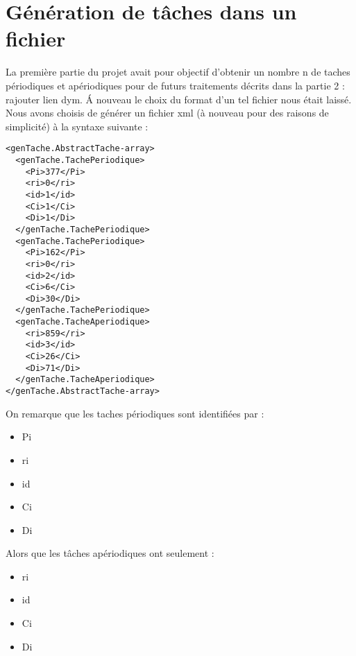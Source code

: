 \chapter{Génération de tâches dans un fichier}
La première partie du projet avait pour objectif d'obtenir un nombre n de taches périodiques et apériodiques pour de futurs traitements décrits dans la partie 2 : rajouter lien dym. \'A nouveau le choix du format d'un tel fichier nous était laissé. Nous avons choisis de générer un fichier xml (à nouveau pour des raisons  de simplicité) à la syntaxe suivante : 
\begin{lstlisting}
<genTache.AbstractTache-array>
  <genTache.TachePeriodique>
    <Pi>377</Pi>
    <ri>0</ri>
    <id>1</id>
    <Ci>1</Ci>
    <Di>1</Di>
  </genTache.TachePeriodique>
  <genTache.TachePeriodique>
    <Pi>162</Pi>
    <ri>0</ri>
    <id>2</id>
    <Ci>6</Ci>
    <Di>30</Di>
  </genTache.TachePeriodique>
  <genTache.TacheAperiodique>
    <ri>859</ri>
    <id>3</id>
    <Ci>26</Ci>
    <Di>71</Di>
  </genTache.TacheAperiodique>
</genTache.AbstractTache-array>
\end{lstlisting}
On remarque que les taches périodiques sont identifiées par : 
\begin{itemize}
\item
Pi 
\item
ri 
\item
id 
\item
Ci
\item
Di  
\end{itemize} 
Alors que les tâches apériodiques ont seulement : 
\begin{itemize}
\item
ri 
\item
id 
\item
Ci
\item
Di 
\end{itemize} 

